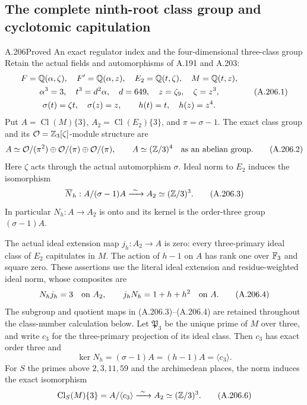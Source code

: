 \subsection{The complete ninth-root class group and cyclotomic capitulation}

\begin{statement}{A.206}{Proved}
{An exact regulator index and the four-dimensional three-class group}
Retain the actual fields and automorphisms of A.191 and A.203:
\[
\begin{gathered}
 F=\mathbb Q(\alpha,\zeta),\quad F'=\mathbb Q(\alpha,z),\quad
 E_2=\mathbb Q(t,\zeta),\quad M=\mathbb Q(t,z),\\
 \alpha^3=3,\quad t^3=d^2\alpha,\quad d=649,
 \quad z=\zeta_9,\quad\zeta=z^3,\\
 \sigma(t)=\zeta t,\quad\sigma(z)=z,
 \qquad h(t)=t,\quad h(z)=z^4.
\end{gathered}
\tag{A.206.1}
\]
Put \(A=\operatorname{Cl}(M)\{3\}\),
\(A_2=\operatorname{Cl}(E_2)\{3\}\), and
\(\pi=\sigma-1\).  The exact class group and its
\(\mathcal O=\mathbb Z_3[\zeta]\)-module structure are
\[
 A\simeq\mathcal O/(\pi^2)\oplus
             \mathcal O/(\pi)\oplus\mathcal O/(\pi),
 \qquad A\simeq(\mathbb Z/3)^4
          \quad\hbox{as an abelian group}.
\tag{A.206.2}
\]
Here \(\zeta\) acts through the actual automorphism
\(\sigma\).  Ideal norm to \(E_2\) induces the
isomorphism
\[
 \overline N_h:A/(\sigma-1)A
            \xrightarrow{\ \sim\ }A_2\simeq(\mathbb Z/3)^3.
\tag{A.206.3}
\]
In particular \(N_h:A\to A_2\) is onto and its kernel
is the order-three group \((\sigma-1)A\).

The actual ideal extension map
\(j_h:A_2\to A\) is zero: every three-primary ideal
class of \(E_2\) capitulates in \(M\).
The action of \(h-1\) on \(A\) has rank one over
\(\mathbb F_3\) and square zero.  These assertions use the
literal ideal extension and residue-weighted ideal norm,
whose composites are
\[
 N_hj_h=3\quad\hbox{on }A_2,\qquad
 j_hN_h=1+h+h^2\quad\hbox{on }A.
\tag{A.206.4}
\]
The subgroup and quotient maps in (A.206.3)--(A.206.4)
are retained throughout the class-number calculation below.
Let \(\mathfrak P_3\) be the unique prime of \(M\)
over three, and write \(c_3\) for the three-primary
projection of its ideal class.  Then \(c_3\) has exact
order three and
\[
 \ker N_h=(\sigma-1)A=(h-1)A=\langle c_3\rangle.
\tag{A.206.5}
\]
For \(S\) the primes above \(2,3,11,59\) and the
archimedean places, the norm induces the exact isomorphism
\[
 \operatorname{Cl}_S(M)\{3\}
       =A/\langle c_3\rangle
       \xrightarrow{\ \sim\ }A_2\simeq(\mathbb Z/3)^3.
\tag{A.206.6}
\]
\end{statement}

